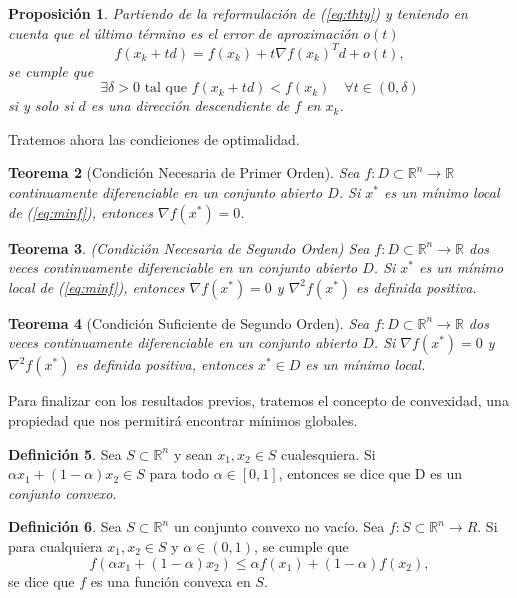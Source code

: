 \documentclass[11pt,a4paper]{book}
\newtheorem{theorem}{Teorema}[chapter]
\newtheorem{proposition}[theorem]{Proposición}
\theoremstyle{definition}
\newtheorem{definition}[theorem]{Definición}
\theoremstyle{remark}
\begin{document}
\begin{proposition}
Partiendo de la reformulación de (\ref{eq:thty}) y teniendo en cuenta que el último término
es el error de aproximación $o(t)$
\begin{equation}
	f(x_k + td) = f(x_k) + t \nabla f(x_k)^Td + o(t),
\end{equation}
se cumple que
\begin{equation}
	\exists \delta > 0 \text{ tal que } f(x_k + td) < f(x_k)
	\quad \forall t \in (0, \delta)
\end{equation}
si y solo si $d$ es una dirección descendiente de $f$ en $x_k$.

\end{proposition}

Tratemos ahora las condiciones de optimalidad.

\begin{theorem}[Condición Necesaria de Primer Orden]
	Sea $f:D\subset \mathbb{R}^n \rightarrow \mathbb{R}$ continuamente diferenciable en un
	conjunto abierto $D$. Si $x^*$ es un mínimo local de (\ref{eq:minf}), entonces
	$\nabla f(x^*) = 0$.
\end{theorem}

\begin{theorem}
	(Condición Necesaria de Segundo Orden)
	Sea $f:D\subset \mathbb{R}^n \rightarrow \mathbb{R}$ dos veces continuamente diferenciable
	en un conjunto abierto $D$. Si $x^*$ es un mínimo local de (\ref{eq:minf}), entonces
	$\nabla f(x^*) = 0$ y $\nabla^2 f(x^*)$ es definida positiva.
\end{theorem}

\begin{theorem}[Condición Suficiente de Segundo Orden]
	Sea $f:D\subset \mathbb{R}^n \rightarrow \mathbb{R}$ dos veces continuamente diferenciable
	en un conjunto abierto $D$. Si $\nabla f(x^*) = 0$ y $\nabla^2 f(x^*)$ es definida positiva,
	entonces $x^* \in D$ es un mínimo local.
\end{theorem}

Para finalizar con los resultados previos, tratemos el concepto de convexidad, una propiedad
que nos permitirá encontrar mínimos globales.

\begin{definition}
	Sea $S\subset \mathbb{R}^n$ y sean $x_1, x_2 \in S$ cualesquiera. Si
	$\alpha x_1 + (1 - \alpha)x_2 \in S$ para todo $\alpha \in [0,1]$, entonces se dice que D
	es un \textit{conjunto convexo}.
\end{definition}
\begin{definition}
	Sea $S \subset \mathbb{R}^n$ un conjunto convexo no vacío. Sea $f: S \subset \mathbb{R}^n
	\rightarrow R$. Si para cualquiera $x_1, x_2 \in S$ y
	$\alpha \in (0,1)$, se cumple que
	\begin{equation}
		f(\alpha x_1 + (1-\alpha)x_2) \leq \alpha f(x_1) + (1-\alpha)f(x_2),
	\end{equation}
	se dice que $f$ es una función convexa en $S$.
\end{definition}
\end{document}
